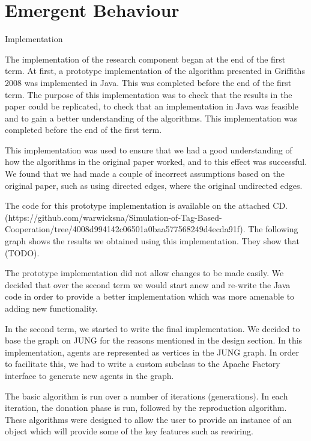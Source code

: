 \section{Emergent Behaviour}

Implementation

The implementation of the research component began at the end of the first term. At first, a prototype implementation of the algorithm presented in Griffiths 2008 was implemented in Java. This was completed before the end of the first term. The purpose of this implementation was to check that the results in the paper could be replicated, to check that an implementation in Java was feasible and to gain a better understanding of the algorithms. This implementation was completed before the end of the first term.

This implementation was used to ensure that we had a good understanding of how the algorithms in the original paper worked, and to this effect was successful. We found that we had made a couple of incorrect assumptions based on the original paper, such as using directed edges, where the original undirected edges. 

The code for this prototype implementation is available on the attached CD. (https://github.com/warwicksna/Simulation-of-Tag-Based-Cooperation/tree/4008d994142c06501a0baa577568249d4ecda91f). The following graph shows the results we obtained using this implementation. They show that (TODO).

The prototype implementation did not allow changes to be made easily. We decided that over the second term we would start anew and re-write the Java code in order to provide a better implementation which was more amenable to adding new functionality.

In the second term, we started to write the final implementation. We decided to base the graph on JUNG for the reasons mentioned in the design section. In this implementation, agents are represented as vertices in the JUNG graph. In order to facilitate this, we had to write a custom subclass to the Apache Factory interface to generate new agents in the graph.

The basic algorithm is run over a number of iterations (generations). In each iteration, the donation phase is run, followed by the reproduction algorithm. These algorithms were designed to allow the user to provide an instance of an object which will provide some of the key features such as rewiring.

